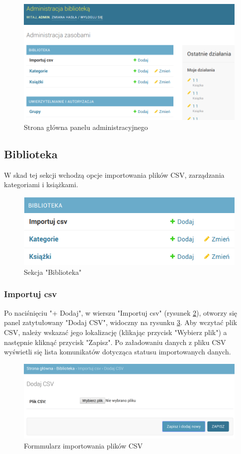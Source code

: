 \documentclass[twoside]{projektInzynierskiMS}
\begin{document}
\begin{figure}[h]
  \centering
  \includegraphics[width=0.4\linewidth]{img/PanelAdmin.png}
  \caption{Strona główna panelu administracyjnego}
  \label{fig:adminPanel}
\end{figure}

\subsection{Biblioteka}
W skad tej sekcji wchodzą opcje importowania plików CSV, zarządzania kategoriami i książkami.

\begin{figure}[h]
  \centering
  \includegraphics[width=0.6\linewidth]{img/biblioteka.png}
  \caption{Sekcja "Biblioteka"}
  \label{fig:biblioteka}
\end{figure}

\subsubsection{Importuj csv}
Po naciśnięciu "+ Dodaj", w wierszu "Importuj csv" (rysunek \ref{fig:biblioteka}), otworzy się panel zatytułowany "Dodaj CSV", widoczny na rysunku \ref{fig:importCSV}. Aby wczytać plik CSV, należy wskazać jego lokalizację (klikając przycisk "Wybierz plik") a następnie kliknąć przycisk "Zapisz". Po załadowaniu danych z pliku CSV wyświetli się lista komunikatów dotycząca statusu importowanych danych. 

\begin{figure}[h]
  \centering
  \includegraphics[width=0.6\linewidth]{img/ImportCSV.png}
  \caption{Formmularz importowania plików CSV}
  \label{fig:importCSV}
\end{figure}
\end{document}
